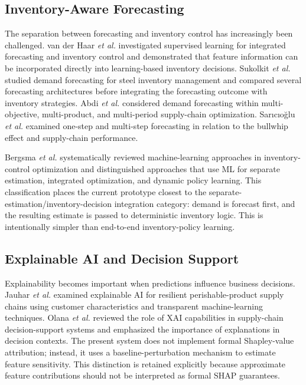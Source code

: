 \documentclass[9pt,conference]{IEEEtran}
\providecommand{\syscite}[1]{}
\begin{document}
\subsection{Inventory-Aware Forecasting}
The separation between forecasting and inventory control has increasingly been challenged. \syscite{[cite: 1]} van der Haar \textit{et al.} investigated supervised learning for integrated forecasting and inventory control and demonstrated that feature information can be incorporated directly into learning-based inventory decisions. \syscite{[cite: 1]} Sukolkit \textit{et al.} studied demand forecasting for steel inventory management and compared several forecasting architectures before integrating the forecasting outcome with inventory strategies. \syscite{[cite: 1]} Abdi \textit{et al.} considered demand forecasting within multi-objective, multi-product, and multi-period supply-chain optimization. \syscite{[cite: 1]} Sarıcıoğlu \textit{et al.} examined one-step and multi-step forecasting in relation to the bullwhip effect and supply-chain performance. \syscite{[cite: 1]}

Bergsma \textit{et al.} systematically reviewed machine-learning approaches in inventory-control optimization and distinguished approaches that use ML for separate estimation, integrated optimization, and dynamic policy learning. \syscite{[cite: 1]} This classification places the current prototype closest to the separate-estimation/inventory-decision integration category: demand is forecast first, and the resulting estimate is passed to deterministic inventory logic. \syscite{[cite: 1]} This is intentionally simpler than end-to-end inventory-policy learning. \syscite{[cite: 1]}

\subsection{Explainable AI and Decision Support}
Explainability becomes important when predictions influence business decisions. \syscite{[cite: 1]} Jauhar \textit{et al.} examined explainable AI for resilient perishable-product supply chains using customer characteristics and transparent machine-learning techniques. \syscite{[cite: 1]} Olana \textit{et al.} reviewed the role of XAI capabilities in supply-chain decision-support systems and emphasized the importance of explanations in decision contexts. \syscite{[cite: 1]} The present system does not implement formal Shapley-value attribution; instead, it uses a baseline-perturbation mechanism to estimate feature sensitivity. \syscite{[cite: 1]} This distinction is retained explicitly because approximate feature contributions should not be interpreted as formal SHAP guarantees. \syscite{[cite: 1]}
\end{document}
